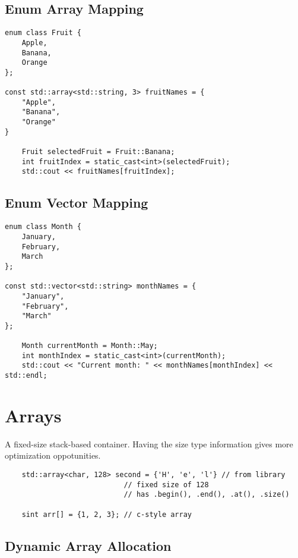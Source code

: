 \subsection{Enum Array Mapping}

\begin{verbatim}
enum class Fruit {
    Apple,
    Banana,
    Orange
};

const std::array<std::string, 3> fruitNames = {
    "Apple",
    "Banana",
    "Orange"
}

    Fruit selectedFruit = Fruit::Banana;
    int fruitIndex = static_cast<int>(selectedFruit);
    std::cout << fruitNames[fruitIndex];
\end{verbatim}

\subsection{Enum Vector Mapping}

\begin{verbatim}
enum class Month {
    January,
    February,
    March
};

const std::vector<std::string> monthNames = {
    "January",
    "February",
    "March"
};

    Month currentMonth = Month::May;
    int monthIndex = static_cast<int>(currentMonth);
    std::cout << "Current month: " << monthNames[monthIndex] << std::endl;
\end{verbatim}

\section{Arrays}

A fixed-size stack-based container. Having the size type information gives more optimization oppotunities.

\begin{verbatim}
    std::array<char, 128> second = {'H', 'e', 'l'} // from library
                            // fixed size of 128
                            // has .begin(), .end(), .at(), .size() 

    sint arr[] = {1, 2, 3}; // c-style array 
\end{verbatim}

\subsection{Dynamic Array Allocation}

